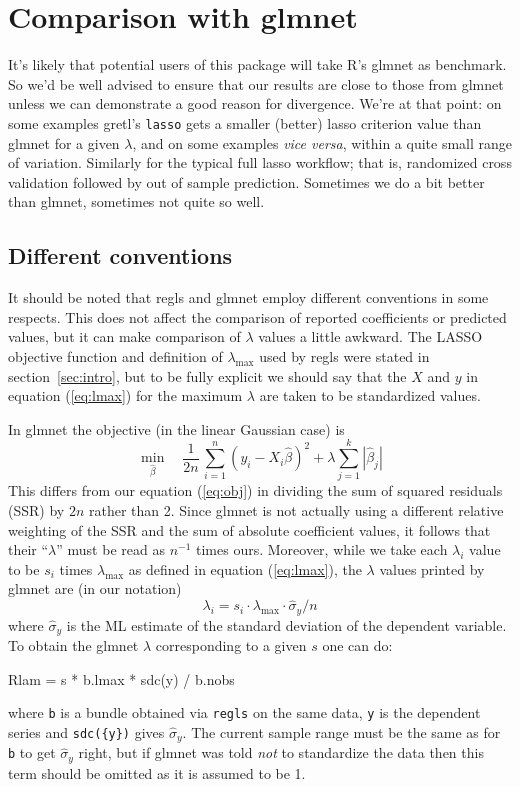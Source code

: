 \documentclass{article}
\newcommand{\startappendices}{%
\newcounter{appcount}
\setcounter{appcount}{0}
\renewcommand{\thesection}{Appendix \Alph{appcount}}}
\newcommand{\myappendix}[1]{%
\addtocounter{appcount}{1}
\section{#1}}
\begin{document}



\clearpage
\startappendices

\myappendix{Comparison with glmnet}
\label{sec:comparison}

It's likely that potential users of this package will take
\textsf{R}'s \textsf{glmnet} as benchmark. So we'd be well advised to
ensure that our results are close to those from \textsf{glmnet} unless
we can demonstrate a good reason for divergence. We're at that point:
on some examples gretl's \texttt{lasso} gets a smaller (better) lasso
criterion value than \textsf{glmnet} for a given $\lambda$, and on
some examples \textit{vice versa}, within a quite small range of
variation. Similarly for the typical full \textsf{lasso} workflow;
that is, randomized cross validation followed by out of sample
prediction. Sometimes we do a bit better than \textsf{glmnet},
sometimes not quite so well.

\subsection*{Different conventions}

It should be noted that \textsf{regls} and \textsf{glmnet} employ
different conventions in some respects. This does not affect the
comparison of reported coefficients or predicted values, but it can
make comparison of $\lambda$ values a little awkward. The LASSO
objective function and definition of $\lambda_{\max}$ used by
\textsf{regls} were stated in section~\ref{sec:intro}, but to be fully
explicit we should say that the $X$ and $y$ in equation
(\ref{eq:lmax}) for the maximum $\lambda$ are taken to be standardized
values.

In \textsf{glmnet} the objective (in the linear Gaussian case) is
\[
   \min_{\hat{\beta}} \quad \frac{1}{2n}\,
  \sum_{i=1}^n (y_i - X_i\hat{\beta})^2 + \lambda \sum_{j=1}^k |\hat{\beta}_j| 
\]
This differs from our equation (\ref{eq:obj}) in dividing the sum of
squared residuals (SSR) by $2n$ rather than 2. Since \textsf{glmnet}
is not actually using a different relative weighting of the SSR and
the sum of absolute coefficient values, it follows that their
``$\lambda$'' must be read as $n^{-1}$ times ours. Moreover, while we
take each $\lambda_i$ value to be $s_i$ times $\lambda_{\max}$ as
defined in equation (\ref{eq:lmax}), the $\lambda$ values printed by
\textsf{glmnet} are (in our notation)
\[
\lambda_i = s_i \cdot \lambda_{\max} \cdot \hat{\sigma}_y / n 
\]
where $\hat{\sigma}_y$ is the ML estimate of the standard deviation of
the dependent variable. To obtain the \textsf{glmnet} $\lambda$
corresponding to a given $s$ one can do:
\begin{code}
Rlam = s * b.lmax * sdc({y}) / b.nobs
\end{code}
where \texttt{b} is a bundle obtained via \texttt{regls} on the same
data, \texttt{y} is the dependent series and \texttt{sdc(\{y\})} gives
$\hat{\sigma}_y$. The current sample range must be the same as for
\texttt{b} to get $\hat{\sigma}_y$ right, but if \textsf{glmnet} was
told \textit{not} to standardize the data then this term should be
omitted as it is assumed to be 1.
\end{document}
